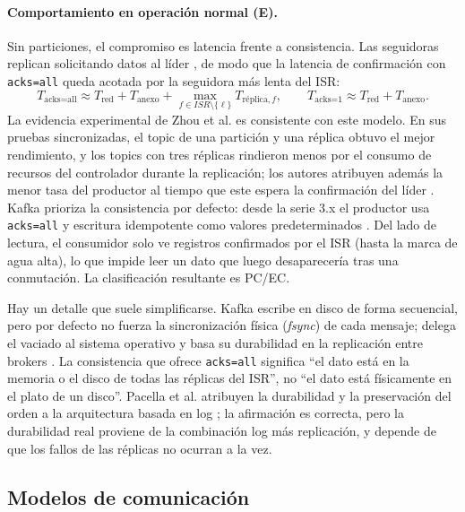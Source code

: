 \documentclass[11pt,a4paper]{article}
\begin{document}
\paragraph{Comportamiento en operación normal (E).}
Sin particiones, el compromiso es latencia frente a consistencia. Las seguidoras replican solicitando datos al líder \cite{kafkadocs}, de modo que la latencia de confirmación con \texttt{acks=all} queda acotada por la seguidora más lenta del ISR:
\begin{equation}
T_{\text{acks=all}} \approx T_{\text{red}} + T_{\text{anexo}} + \max_{f \in ISR \setminus \{\ell\}} T_{\text{réplica},f},
\qquad
T_{\text{acks=1}} \approx T_{\text{red}} + T_{\text{anexo}}.
\end{equation}
La evidencia experimental de Zhou et al. es consistente con este modelo. En sus pruebas sincronizadas, el topic de una partición y una réplica obtuvo el mejor rendimiento, y los topics con tres réplicas rindieron menos por el consumo de recursos del controlador durante la replicación; los autores atribuyen además la menor tasa del productor al tiempo que este espera la confirmación del líder \cite{zhou2024distributed}. Kafka prioriza la consistencia por defecto: desde la serie 3.x el productor usa \texttt{acks=all} y escritura idempotente como valores predeterminados \cite{kafkadocs}. Del lado de lectura, el consumidor solo ve registros confirmados por el ISR (hasta la marca de agua alta), lo que impide leer un dato que luego desaparecería tras una conmutación. La clasificación resultante es PC/EC.

Hay un detalle que suele simplificarse. Kafka escribe en disco de forma secuencial, pero por defecto no fuerza la sincronización física (\emph{fsync}) de cada mensaje; delega el vaciado al sistema operativo y basa su durabilidad en la replicación entre brokers \cite{kafkadocs}. La consistencia que ofrece \texttt{acks=all} significa \enquote{el dato está en la memoria o el disco de todas las réplicas del ISR}, no \enquote{el dato está físicamente en el plato de un disco}. Pacella et al. atribuyen la durabilidad y la preservación del orden a la arquitectura basada en log \cite{pacella2025scalable}; la afirmación es correcta, pero la durabilidad real proviene de la combinación log más replicación, y depende de que los fallos de las réplicas no ocurran a la vez.

\subsection{Modelos de comunicación}
\end{document}
